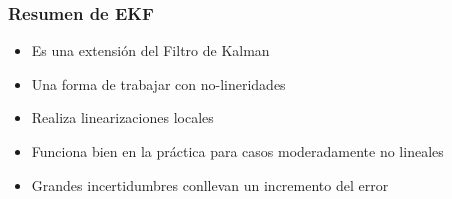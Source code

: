 \begin{frame}
	\frametitle{Resumen de EKF}
	
	\begin{itemize}
		\item Es una extensión del Filtro de Kalman
		\item Una forma de trabajar con no-lineridades
		\item Realiza linearizaciones locales
		\item Funciona bien en la práctica para casos moderadamente no lineales
		\item Grandes incertidumbres conllevan un incremento del error
	\end{itemize}
	
\end{frame}

